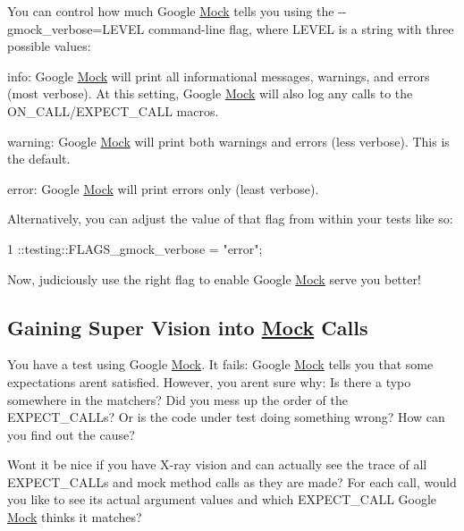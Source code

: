 You can control how much Google \hyperlink{class_mock}{Mock} tells you using the {\ttfamily -\/-\/gmock\+\_\+verbose=L\+E\+V\+EL} command-\/line flag, where {\ttfamily L\+E\+V\+EL} is a string with three possible values\+:


\begin{DoxyItemize}
\item {\ttfamily info}\+: Google \hyperlink{class_mock}{Mock} will print all informational messages, warnings, and errors (most verbose). At this setting, Google \hyperlink{class_mock}{Mock} will also log any calls to the {\ttfamily O\+N\+\_\+\+C\+A\+L\+L/\+E\+X\+P\+E\+C\+T\+\_\+\+C\+A\+LL} macros.
\item {\ttfamily warning}\+: Google \hyperlink{class_mock}{Mock} will print both warnings and errors (less verbose). This is the default.
\item {\ttfamily error}\+: Google \hyperlink{class_mock}{Mock} will print errors only (least verbose).
\end{DoxyItemize}

Alternatively, you can adjust the value of that flag from within your tests like so\+:


\begin{DoxyCode}
1 ::testing::FLAGS\_gmock\_verbose = "error";
\end{DoxyCode}


Now, judiciously use the right flag to enable Google \hyperlink{class_mock}{Mock} serve you better!

\subsection*{Gaining Super Vision into \hyperlink{class_mock}{Mock} Calls}

You have a test using Google \hyperlink{class_mock}{Mock}. It fails\+: Google \hyperlink{class_mock}{Mock} tells you that some expectations aren\textquotesingle{}t satisfied. However, you aren\textquotesingle{}t sure why\+: Is there a typo somewhere in the matchers? Did you mess up the order of the {\ttfamily E\+X\+P\+E\+C\+T\+\_\+\+C\+A\+LL}s? Or is the code under test doing something wrong? How can you find out the cause?

Won\textquotesingle{}t it be nice if you have X-\/ray vision and can actually see the trace of all {\ttfamily E\+X\+P\+E\+C\+T\+\_\+\+C\+A\+LL}s and mock method calls as they are made? For each call, would you like to see its actual argument values and which {\ttfamily E\+X\+P\+E\+C\+T\+\_\+\+C\+A\+LL} Google \hyperlink{class_mock}{Mock} thinks it matches?

